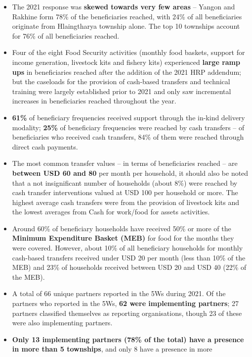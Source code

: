 \documentclass[
]{article}
\begin{document}
\begin{itemize}
\item
  The 2021 response was \textbf{skewed towards very few areas} -- Yangon
  and Rakhine form 78\% of the beneficiaries reached, with 24\% of all
  beneficiaries originate from Hlaingtharya township alone. The top 10
  townships account for 76\% of all beneficiaries reached.
\item
  Four of the eight Food Security activities (monthly food baskets,
  support for income generation, livestock kits and fishery kits)
  experienced \textbf{large ramp ups} in beneficiaries reached after the
  addition of the 2021 HRP addendum; but the caseloads for the provision
  of cash-based transfers and technical training were largely
  established prior to 2021 and only saw incremental increases in
  beneficiaries reached throughout the year.
\item
  \textbf{61\%} of beneficiary frequencies received support through the
  in-kind delivery modality; \textbf{25\%} of beneficiary frequencies
  were reached by cash transfers -- of beneficiaries who received cash
  transfers, 84\% of them were reached through direct cash payments.
\item
  The most common transfer values -- in terms of beneficiaries reached
  -- are \textbf{between USD 60 and 80} per month per household, it
  should also be noted that a not insignificant number of households
  (about 8\%) were reached by cash transfer interventions valued at USD
  100 per household or more. The highest average cash transfers were
  from the provision of livestock kits and the lowest averages from Cash
  for work/food for assets activities.
\item
  Around 60\% of beneficiary households have received 50\% or more of
  the \textbf{Minimum Expenditure Basket (MEB)} for food for the months
  they were covered. However, about 10\% of all beneficiary households
  for monthly cash-based transfers received under USD 20 per month (less
  than 10\% of the MEB) and 23\% of households received between USD 20
  and USD 40 (22\% of the MEB).
\item
  A total of 66 unique partners reported in the 5Ws during 2021. Of the
  partners who reported in the 5Ws, \textbf{62 were implementing
  partners}; 27 partners classified themselves as reporting
  organisations, though 23 of these were also implementing partners.
\item
  \textbf{Only 13 implementing partners (78\% of the total) have a
  presence in more than 5 townships}, and only 8 have a presence in more

\end{itemize}
\end{document}
